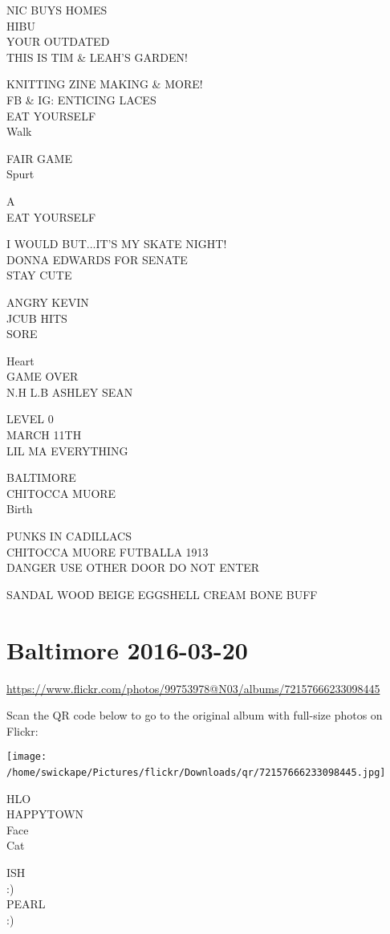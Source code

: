 \documentclass[10pt,letterpaper]{article}
\begin{document}
NIC BUYS HOMES\\
HIBU\\
YOUR OUTDATED\\
THIS IS TIM \& LEAH'S GARDEN!

KNITTING ZINE MAKING \& MORE!\\
FB \& IG: ENTICING LACES\\
EAT YOURSELF\\
Walk

FAIR GAME\\
Spurt

A\\
EAT YOURSELF

I WOULD BUT...IT'S MY SKATE NIGHT!\\
DONNA EDWARDS FOR SENATE\\
STAY CUTE

ANGRY KEVIN\\
JCUB HITS\\
SORE

Heart\\
GAME OVER\\
N.H L.B ASHLEY SEAN

LEVEL 0\\
MARCH 11TH\\
LIL MA EVERYTHING

BALTIMORE\\
CHITOCCA MUORE\\
Birth

PUNKS IN CADILLACS\\
CHITOCCA MUORE FUTBALLA 1913\\
DANGER USE OTHER DOOR DO NOT ENTER

SANDAL WOOD BEIGE EGGSHELL CREAM BONE BUFF
\

\section*{Baltimore 2016-03-20}

\url{https://www.flickr.com/photos/99753978@N03/albums/72157666233098445}

Scan the QR code below to go to the original album with full-size photos on Flickr:

\texttt{[image: /home/swickape/Pictures/flickr/Downloads/qr/72157666233098445.jpg]}
\

HLO\\
HAPPYTOWN\\
Face\\
Cat

ISH\\
:)\\
PEARL\\
:)
\end{document}
